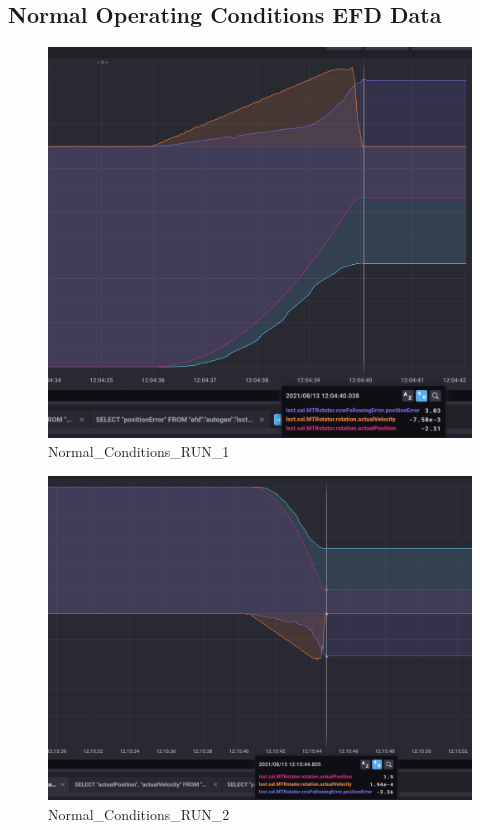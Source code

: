 \documentclass[SE,authoryear,toc, lsstdraft]{lsstdoc}
\begin{document}
\subsection{Normal Operating Conditions EFD Data}
\begin{figure}
  \includegraphics[width=\linewidth]{media/followingFault_1.png}
  \caption{Normal\_Conditions\_RUN\_1}
  \label{fig:Normal_Conditions_RUN_1}
\end{figure}

\begin{figure}
  \includegraphics[width=\linewidth]{media/followingFault_2.png}
  \caption{Normal\_Conditions\_RUN\_2}
  \label{fig:Normal_Conditions_RUN_2}
\end{figure}
\end{document}
